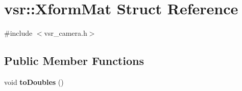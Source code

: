 \hypertarget{structvsr_1_1_xform_mat}{\section{vsr\-:\-:Xform\-Mat Struct Reference}
\label{structvsr_1_1_xform_mat}
}


{\ttfamily \#include $<$vsr\-\_\-camera.\-h$>$}

\subsection*{Public Member Functions}
\begin{DoxyCompactItemize}
\item 
\hypertarget{structvsr_1_1_xform_mat_af4a70dc90ba7263a0d7f198eed1a4ea0}{void {\bfseries to\-Doubles} ()}\label{structvsr_1_1_xform_mat_af4a70dc90ba7263a0d7f198eed1a4ea0}

\end{DoxyCompactItemize}

